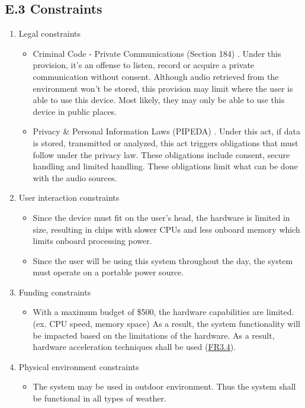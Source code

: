 \documentclass[12pt]{article}
\theoremstyle{definition}
\begin{document}
\subsection{E.3 Constraints} \label{sec:constraints}

\begin{enumerate}
  \item Legal constraints
  \begin{itemize}
    \item Criminal Code - Private Communications (Section 184)
    \cite{CriminalCode184}. Under this provision, it's an offense to listen,
    record or acquire a private communication without consent. Although audio
    retrieved from the environment won't be stored, this provision may limit
    where the user is able to use this device. Most likely, they may only be
    able to use this device in public places.
    \item Privacy \& Personal Information Laws (PIPEDA) \cite{PIPEDA2000}. Under
    this act, if data is stored, transmitted or analyzed, this act triggers
    obligations that must follow under the privacy law. These obligations
    include consent, secure handling and limited handling. These obligations
    limit what can be done with the audio sources.
  \end{itemize}

  \item User interaction constraints
  \begin{itemize}
    \item Since the device must fit on the user's head, the hardware is limited
    in size, resulting in chips with slower CPUs and less onboard memory which
    limits onboard processing power. 
    \item Since the user will be using this system throughout the day, the
    system must operate on a portable power source.
  \end{itemize}

  \item Funding constraints
  \begin{itemize}
    \item With a maximum budget of \$500, the hardware capabilities are limited.
    (ex. CPU speed, memory space) As a result, the system functionality will be
    impacted based on the limitations of the hardware. As a result, hardware
    acceleration techniques shall be used (\hyperref[FR3_4]{FR3.4}).
  \end{itemize}

  \item Physical environment constraints
  \begin{itemize}
    \item The system may be used in outdoor environment. Thus the system shall
    be functional in all types of weather.
  \end{itemize}
\end{enumerate}
\end{document}
